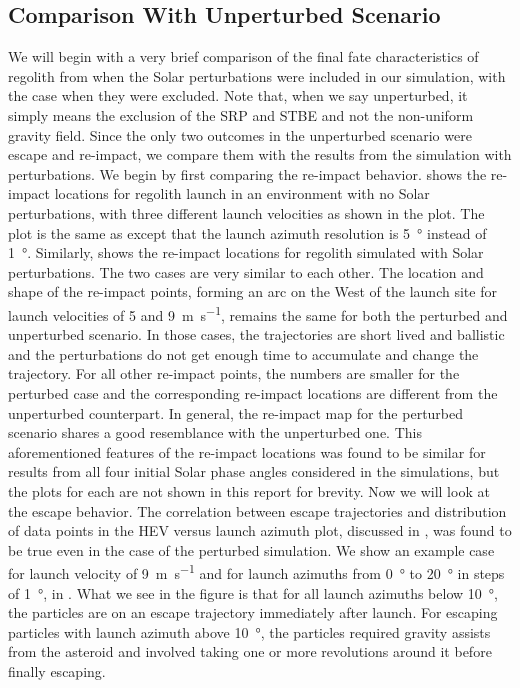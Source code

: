\subsection{Comparison With Unperturbed Scenario}
\label{subsec:noSP_comparison_reimpact_and_escape}
We will begin with a very brief comparison of the final fate characteristics of regolith from when the Solar perturbations were included in our simulation, with the case when they were excluded. Note that, when we say unperturbed, it simply means the exclusion of the \gls{SRP} and \gls{STBE} and not the non-uniform gravity field. Since the only two outcomes in the unperturbed scenario were escape and re-impact, we compare them with the results from the simulation with perturbations.
%
\newline\newline
%
We begin by first comparing the re-impact behavior.  shows the re-impact locations for regolith launch in an environment with no Solar perturbations, with three different launch velocities as shown in the plot. The plot is the same as  except that the launch azimuth resolution is \SI{5}{\degree} instead of \SI{1}{\degree}. Similarly,  shows the re-impact locations for regolith simulated with Solar perturbations. The two cases are very similar to each other. The location and shape of the re-impact points, forming an arc on the West of the launch site for launch velocities of 5 and \SI{9}{\metre\per\second}, remains the same for both the perturbed and unperturbed scenario. In those cases, the trajectories are short lived and ballistic and the perturbations do not get enough time to accumulate and change the trajectory. For all other re-impact points, the numbers are smaller for the perturbed case and the corresponding re-impact locations are different from the unperturbed counterpart. In general, the re-impact map for the perturbed scenario shares a good resemblance with the unperturbed one. This aforementioned features of the re-impact locations was found to be similar for results from all four initial Solar phase angles considered in the simulations, but the plots for each are not shown in this report for brevity.
%
\newline\newline
%
Now we will look at the escape behavior. The correlation between escape trajectories and distribution of data points in the \gls{HEV} versus launch azimuth plot, discussed in , was found to be true even in the case of the perturbed simulation. We show an example case for launch velocity of \SI{9}{\metre\per\second} and for launch azimuths from \SI{0}{\degree} to \SI{20}{\degree} in steps of \SI{1}{\degree}, in . What we see in the figure is that for all launch azimuths below \SI{10}{\degree}, the particles are on an escape trajectory immediately after launch. For escaping particles with launch azimuth above \SI{10}{\degree}, the particles required gravity assists from the asteroid and involved taking one or more revolutions around it before finally escaping.
